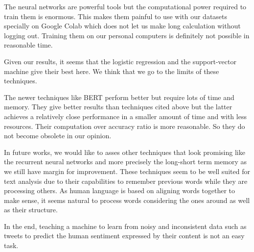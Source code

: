 \documentclass[11pt, a4paper, twocolumn]{article}
\begin{document}
The neural networks are powerful tools but the computational power required to train them 
is enormous. This makes them painful to use with our datasets specially on Google Colab which does not let us make long calculation without logging out. Training them on our personal computers is definitely not possible in reasonable time.

Given our results, it seems that the logistic regression and the support-vector machine give their best here. We think that we go to the limits of these techniques. 

The newer techniques like BERT perform better but require lots of time and memory. They give better results than techniques cited above but the latter achieves a relatively close 
performance in a smaller amount of time and with less resources. Their computation over accuracy ratio is more reasonable. So they do not become obsolete in our opinion.

In future works, we would like to asses other techniques that look promising like the recurrent neural networks and more precisely the long-short term memory as we still have margin for improvement. These techniques seem to be well suited for text analysis due to their capabilities to remember previous words while they are processing others. As human 
language is based on aligning words together to make sense, it seems natural to process words considering the ones around as well as their structure. 

In the end, teaching a machine to learn from noisy and inconsistent data such as tweets to predict the human sentiment expressed by their content is not an easy task.

\clearpage
\onecolumn
\end{document}

